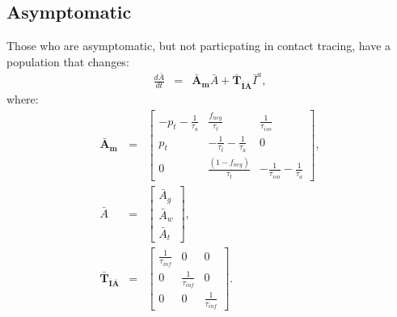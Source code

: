 \documentclass[notitlepage, superscriptaddress]{revtex4-2}
\begin{document}
\subsection{Asymptomatic}
Those who are asymptomatic, but not particpating in contact tracing, have a population that changes:
\begin{eqnarray}
\frac{d\bar{A}}{dt} &=& \boldsymbol{\bar{A}_{m}}  \bar{A} + \boldsymbol{\bar{T}_{\bar{I}\bar{A}}}  \bar{I}^{a}, 
\end{eqnarray}
where:
%
\begin{eqnarray}
\boldsymbol{\bar{A}_{m}} &=&
\begin{bmatrix}
- p_{t} -\frac{1}{\tau_{a}}  &  \frac{f_{neg}}{\tau_{t}}            & \frac{1}{\tau_{iso}} \\ 
 p_{t}              & -\frac{1}{\tau_{t}} -\frac{1}{\tau_{a}}       & 0  \\ 
 0                  & \frac{(1- f_{neg})}{\tau_{t}}                        & -\frac{1}{\tau_{iso}} -\frac{1}{\tau_{a}}
\end{bmatrix}, \\ 
%
\bar{A} &=& 
\begin{bmatrix}
\bar{A}_{g} \\ \bar{A}_{w}\\ \bar{A}_{t}
\end{bmatrix}, \\ 
%
\boldsymbol{\bar{T}_{\bar{I}\bar{A}}} &=&
\begin{bmatrix}
\frac{1}{\tau_{inf}}  & 0                 & 0 \\ 
 0          &  \frac{1}{\tau_{inf}}  & 0 \\ 
 0          & 0                 &  \frac{1}{\tau_{inf}} 
\end{bmatrix}.
%
\end{eqnarray}
\end{document}
